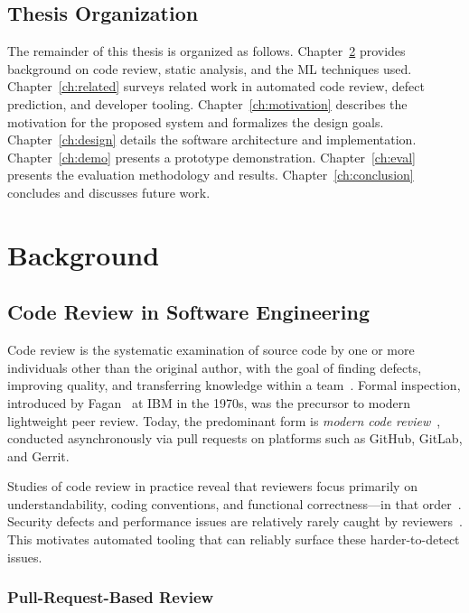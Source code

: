 \documentclass[12pt, oneside]{report}
\begin{document}
\section{Thesis Organization}
\label{sec:organization}

The remainder of this thesis is organized as follows. Chapter~\ref{ch:background} provides
background on code review, static analysis, and the ML techniques used. Chapter~\ref{ch:related}
surveys related work in automated code review, defect prediction, and developer tooling.
Chapter~\ref{ch:motivation} describes the motivation for the proposed system and formalizes
the design goals. Chapter~\ref{ch:design} details the software architecture and implementation.
Chapter~\ref{ch:demo} presents a prototype demonstration. Chapter~\ref{ch:eval} presents
the evaluation methodology and results. Chapter~\ref{ch:conclusion} concludes and discusses
future work.

\chapter{Background}
\label{ch:background}

\section{Code Review in Software Engineering}
\label{sec:bg-codereview}

Code review is the systematic examination of source code by one or more individuals other
than the original author, with the goal of finding defects, improving quality, and
transferring knowledge within a team~\cite{fagan1976}. Formal inspection, introduced by
Fagan~\cite{fagan1976} at IBM in the 1970s, was the precursor to modern lightweight
peer review. Today, the predominant form is \textit{modern code review}~\cite{bacchelli2013},
conducted asynchronously via pull requests on platforms such as GitHub, GitLab, and Gerrit.

Studies of code review in practice reveal that reviewers focus primarily on understandability,
coding conventions, and functional correctness---in that order~\cite{bacchelli2013}. Security
defects and performance issues are relatively rarely caught by reviewers~\cite{mcintosh2016}.
This motivates automated tooling that can reliably surface these harder-to-detect issues.

\subsection{Pull-Request-Based Review}
\end{document}
